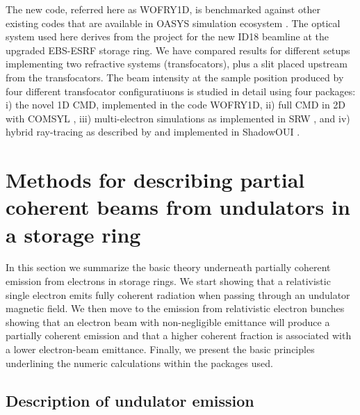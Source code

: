 \documentclass{iucr}              %
\begin{document}
The new code, referred here as WOFRY1D, is benchmarked against other existing codes that are available in OASYS simulation ecosystem \cite{codeOASYS}. The optical system used here derives from the project for the new ID18 beamline at the upgraded EBS-ESRF storage ring. We have compared results for different setups implementing two refractive systems (transfocators), plus a slit placed upstream from the transfocators. The beam intensity at the sample position produced by four different transfocator configuratiuons is studied in detail using four packages: i) the novel 1D CMD, implemented in the code WOFRY1D, ii) full CMD in 2D with COMSYL \cite{codeCOMSYL}, iii) multi-electron simulations as implemented in SRW \cite{codeSRW}, and iv) hybrid ray-tracing as described by  and implemented in ShadowOUI \cite{codeSHADOWOUI}.

\section{Methods for describing partial coherent beams from undulators in a storage ring}\label{sec:part_coh}

In this section we summarize the basic theory underneath partially coherent emission from electrons in storage rings. We start showing that a relativistic single electron emits fully coherent radiation when passing through an undulator magnetic field. We then move to the emission from relativistic electron bunches showing that an electron beam with non-negligible emittance will produce a partially coherent emission and that a higher coherent fraction is associated with a lower electron-beam emittance. Finally, we present the basic principles underlining the numeric calculations within the packages used.


\subsection{Description of undulator emission}
\label{sec:undulator}
\end{document}
